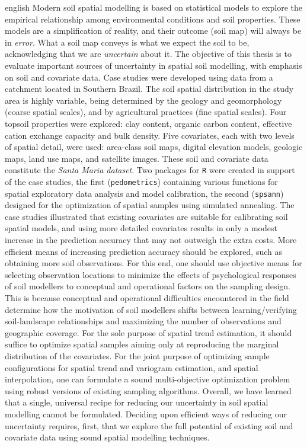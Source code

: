 \documentclass[tese, header]{UFRuralRJ}
\begin{document}
\generalabstracttrue
\begin{generalabstract}{english}{\titleEn}{\keyEn}{\nivelEn}
Modern soil spatial modelling is based on statistical models to explore the empirical relationship among 
environmental conditions and soil properties. These models are a simplification of reality, and their outcome 
(soil map) will always be in \emph{error}. What a soil map conveys is what we expect the soil to be, 
acknowledging that we are \emph{uncertain} about it. The objective of this thesis is to evaluate important 
sources of uncertainty in spatial soil modelling, with emphasis on soil and covariate data. Case studies 
were developed using data from a catchment located in Southern Brazil. The soil spatial distribution in 
the study area is highly variable, being determined by the geology and geomorphology (coarse spatial 
scales), and by agricultural practices (fine spatial scales). Four topsoil properties were explored: clay 
content, organic carbon content, effective cation exchange capacity and bulk density. Five covariates, each 
with two levels of spatial detail, were used: area-class soil maps, digital elevation models, geologic maps, 
land use maps, and satellite images. These soil and covariate data constitute the \emph{Santa Maria dataset}. 
Two packages for \texttt{R} were created in support of the case studies, the first (\texttt{pedometrics}) 
containing various functions for spatial exploratory data analysis and model calibration, the second 
(\texttt{spsann}) designed for the optimization of spatial samples using simulated annealing. The case studies 
illustrated that existing covariates are suitable for calibrating soil spatial models, and using more 
detailed covariates results in only a modest increase in the prediction accuracy that may not outweigh the 
extra costs. More efficient means of increasing prediction accuracy should be explored, such as obtaining more 
soil observations. For this end, one should use objective means for selecting observation locations to 
minimize the effects of psychological responses of soil modellers to conceptual and operational factors on the 
sampling design. This is because conceptual and operational difficulties encountered in the field determine 
how the motivation of soil modellers shifts between learning/verifying soil-landscape relationships and 
maximizing the number of observations and geographic coverage. For the sole purpose of spatial trend 
estimation, it should suffice to optimize spatial samples aiming only at reproducing the marginal distribution 
of the covariates. For the joint purpose of optimizing sample configurations for spatial trend and variogram 
estimation, and spatial interpolation, one can formulate a sound multi-objective optimization problem using 
robust versions of existing sampling algorithms. Overall, we have learned that a single, universal recipe for 
reducing our uncertainty in soil spatial modelling cannot be formulated. Deciding upon efficient ways of 
reducing our uncertainty requires, first, that we explore the full potential of existing soil and covariate 
data using sound spatial modelling techniques.
\end{generalabstract}
\end{document}
